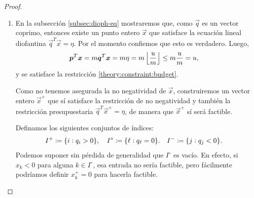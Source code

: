 \begin{proof} \hfill
	\begin{enumerate}
		\item
			En la subsección \ref{subsec:dioph-eq} mostraremos que, como $\vec{q}$ es un vector
			coprimo, entonces existe un punto entero $\vec{x}$ que satisface la
			ecuación lineal diofantina $\vec{q}^T\vec{x} = \eta$. Por el momento confiemos que esto
			es verdadero. Luego,
			\begin{equation*}
				\boldsymbol{p}^T\boldsymbol{x} = m\boldsymbol{q}^T\boldsymbol{x} = m\eta = m\left\lfloor \frac{u}{m} \right\rfloor \leq
				m\frac{u}{m} = u,
			\end{equation*}
			y se satisface la restricción \eqref{theory:constraint:budget}.

			Como no tenemos asegurada la no negatividad de $\vec{x}$, construiremos un vector entero
			$\vec{x}^+$ que sí satisface la restricción de no negatividad y también la restricción
			presupuestaria $\vec{q}^T\vec{x}^+ = \eta$, de manera que $\vec{x}^+$ sí será factible.

			Definamos los siguientes conjuntos de índices:
			\begin{equation*}
				I^+ \coloneq \lbrace i \vcentcolon q_i > 0 \rbrace,
				\quad I^\circ \coloneq \lbrace \ell \vcentcolon q_\ell = 0 \rbrace.
				\quad I^- \coloneq \lbrace j \vcentcolon q_j < 0 \rbrace.
			\end{equation*}
			Podemos suponer sin pérdida de generalidad que $I^\circ$ es vacío. En efecto, si $x_k
			< 0$ para alguna $k \in I^\circ$, esa entrada no sería factible, pero fácilmente
			podríamos definir $x_k^+ = 0$ para hacerla factible.


\end{enumerate}
\end{proof}
